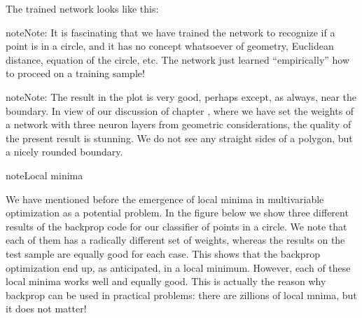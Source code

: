 \documentclass[letterpaper,10pt,english]{jupyterBook}
\begin{document}
\begin{sphinxVerbatim}[commandchars=\\\{\}]
\end{sphinxVerbatim}

\noindent{}

\sphinxAtStartPar
The trained network looks like this:

\begin{sphinxVerbatim}[commandchars=\\\{\}]
\end{sphinxVerbatim}

\noindent{}

\begin{sphinxadmonition}{note}{Note:}
\sphinxAtStartPar
It is fascinating that we have trained the network to recognize if a point is in a circle, and it has no concept whatsoever of geometry, Euclidean distance, equation of the circle, etc. The network just learned “empirically” how to proceed on a training sample!
\end{sphinxadmonition}

\begin{sphinxadmonition}{note}{Note:}
\sphinxAtStartPar
The result in the plot is very good, perhaps except, as always, near the boundary. In view of our discussion of chapter {\hyperref[\detokenize{docs/more_layers:more-lab}]{}}, where we have set the weights of a network with three neuron layers from geometric considerations, the quality of the present result is stunning. We do not see any straight sides of a polygon, but a nicely rounded boundary.
\end{sphinxadmonition}

\begin{sphinxadmonition}{note}{Local minima}

\sphinxAtStartPar
We have mentioned before the emergence of local minima in multivariable optimization as a potential problem. In the figure below we show three different results of the backprop code for our classifier of points in a circle. We note that each of them has a radically different set of weights, whereas the results on the test sample are equally good for each case. This shows that the backprop optimization end up, as anticipated, in a local minimum. However, each of these local minima works well and equally good. This is actually the reason why backprop can be used in practical problems: there are zillions of local mnima, but it does not matter!
\end{sphinxadmonition}
\end{document}
